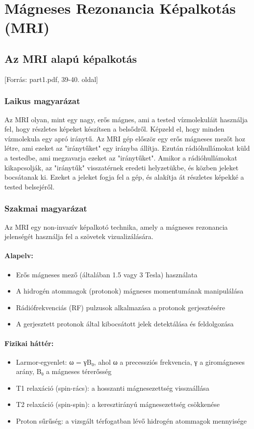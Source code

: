 \documentclass[a4paper,12pt]{article}
\begin{document}
\newpage

\section{Mágneses Rezonancia Képalkotás (MRI)}

\subsection{Az MRI alapú képalkotás} [Forrás: part1.pdf, 39-40. oldal]

\subsubsection{Laikus magyarázat} Az MRI olyan, mint egy nagy, erős mágnes, ami a tested vízmolekuláit használja fel, hogy részletes képeket készítsen a belsődről. Képzeld el, hogy minden vízmolekula egy apró iránytű. Az MRI gép először egy erős mágneses mezőt hoz létre, ami ezeket az "iránytűket" egy irányba állítja. Ezután rádióhullámokat küld a testedbe, ami megzavarja ezeket az "iránytűket". Amikor a rádióhullámokat kikapcsolják, az "iránytűk" visszatérnek eredeti helyzetükbe, és közben jeleket bocsátanak ki. Ezeket a jeleket fogja fel a gép, és alakítja át részletes képekké a tested belsejéről.

\subsubsection{Szakmai magyarázat} Az MRI egy non-invazív képalkotó technika, amely a mágneses rezonancia jelenségét használja fel a szövetek vizualizálására.

\paragraph{Alapelv:} \begin{itemize} \item Erős mágneses mező (általában 1.5 vagy 3 Tesla) használata \item A hidrogén atommagok (protonok) mágneses momentumának manipulálása \item Rádiófrekvenciás (RF) pulzusok alkalmazása a protonok gerjesztésére \item A gerjesztett protonok által kibocsátott jelek detektálása és feldolgozása \end{itemize}

\paragraph{Fizikai háttér:} \begin{itemize} \item Larmor-egyenlet: ω = γB₀, ahol ω a precessziós frekvencia, γ a giromágneses arány, B₀ a mágneses térerősség \item T1 relaxáció (spin-rács): a hosszanti mágnesezettség visszaállása \item T2 relaxáció (spin-spin): a keresztirányú mágnesezettség csökkenése \item Proton sűrűség: a vizsgált térfogatban lévő hidrogén atommagok mennyisége \end{itemize}
\end{document}

